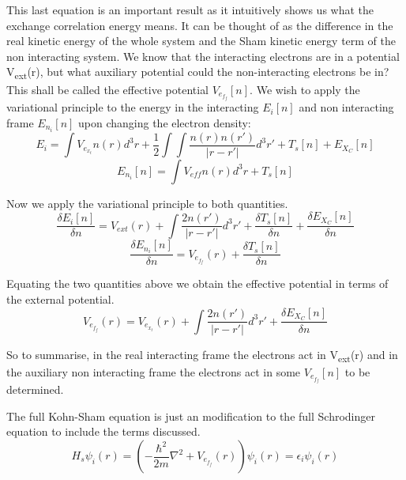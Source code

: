 \documentclass[12pt]{article}
\begin{document}
This last equation is an important result as it intuitively shows us what the exchange correlation energy means. It can be thought of as the difference in the real kinetic energy of the whole system and the Sham kinetic energy term of the non interacting system. We know that the interacting electrons are in a potential V\textsubscript{ext}(r), but what auxiliary potential could the non-interacting electrons be in? This shall be called the effective potential $V_e_f_f[n]$. We wish to apply the variational principle to the energy in the interacting $E_i[n]$ and non interacting frame $E_n_i[n]$ upon changing the electron density:
\begin{equation} \label{2.8} \tag{2.8}
E_i=\int V_e_x_tn(r)d^3r + \frac{1}{2}\int \int \frac{n(r)n(r')}{|r-r'|}d^3 r' + T_s[n]+E_X_C[n]
\end{equation}
\begin{equation} \label{2.9} \tag{2.9}
E_n_i[n]= \int V_{eff} n(r)d^3r + T_s[n]
\end{equation}

Now we apply the variational principle to both quantities. 
\begin{equation} \label{2.10} \tag{2.10}
\frac{\delta E_i[n]}{\delta n} = V_{ext}(r) + \int \frac{2n(r')}{|r-r'|}d^3r'  +\frac{\delta T_s[n]}{\delta n} + \frac{\delta E_X_C[n]}{\delta n}
\end{equation}
\begin{equation} \label{2.11} \tag{2.11}
\frac{\delta E_n_i[n]}{\delta n}= V_e_f_f(r) + \frac{\delta T_s[n]}{\delta n}
\end{equation}

Equating the two quantities above we obtain the effective potential in terms of the external potential.
\begin{equation} \label{2.12} \tag{2.12}
V_e_f_f(r)=V_e_x_t(r)  +\int \frac{2n(r')}{|r-r'|}d^3r' + \frac{\delta E_X_C[n]}{\delta n}
\end{equation}

So to summarise, in the real interacting frame the electrons act in  V\textsubscript{ext}(r) and in the auxiliary non interacting frame the electrons act in some $V_e_f_f[n]$ to be determined.

The full Kohn-Sham equation is just an modification to the full Schrodinger equation to include the terms discussed.
\begin{equation} \label{2.12} \tag{2.13}
H_s \psi_i (r) = (-\frac{\hbar^2}{2m}\nabla^2 +V_e_f_f(r) ) \psi_i (r) = \epsilon_i \psi_i (r)
\end{equation}
\end{document}
